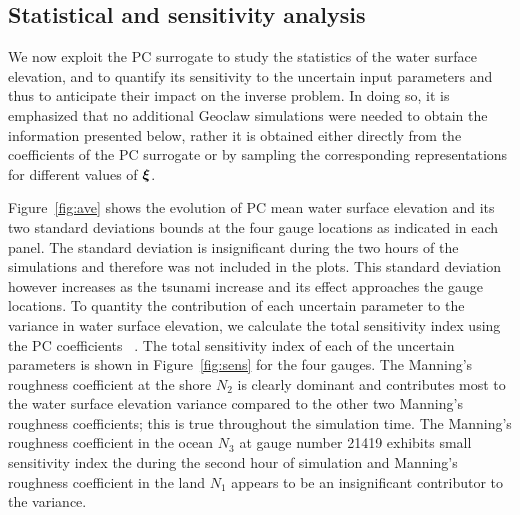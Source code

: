 \subsection{Statistical and sensitivity analysis}
\label{sec:forward}
We now exploit the PC surrogate to study the statistics of the 
water surface elevation, and to quantify its sensitivity to the
uncertain input parameters and thus to anticipate their impact on
the inverse problem.  In doing so, it is emphasized that 
no additional Geoclaw simulations were needed to obtain
the information presented below, rather it is obtained either directly 
from the coefficients of the PC surrogate or by sampling the corresponding
representations for different values of $\xxi$.

Figure~\ref{fig:ave} shows the evolution of
PC mean water surface elevation and its two standard deviations
bounds at the four gauge locations as indicated in each panel.  
The standard deviation is insignificant during the two hours
of the simulations and therefore was not included in the plots.
This standard deviation however increases as the tsunami increase
and its effect approaches the gauge locations. 
To quantity the contribution of each
uncertain parameter to the variance in water surface elevation, we calculate the total sensitivity index 
using the PC coefficients ~\citep{Alexanderian2012,Sudret,Crestaux}. The total sensitivity index
of  each of the uncertain parameters is shown in
Figure~\ref{fig:sens} for the four gauges. The Manning's roughness coefficient
at the shore $N_2$ is clearly dominant and contributes
most to the  water surface elevation variance compared to the other two 
Manning's roughness coefficients;
this is true throughout the simulation time.  The Manning's roughness coefficient
in the ocean $N_{3}$ at gauge number 21419 exhibits small sensitivity index 
the during the second hour of simulation and Manning's roughness coefficient
in the land $N_1$ appears to be an insignificant contributor
to the variance.
